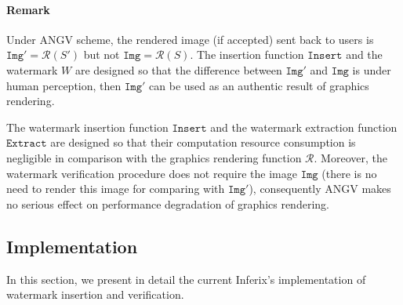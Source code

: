 \documentclass[a4paper,11pt,onecolumn]{memoir}
\begin{document}
\paragraph[Remark]{Remark}
Under ANGV scheme, the rendered image (if accepted) sent back to users is $\mathtt{Img'} = \mathcal{R}\left(S'\right)$ but not $\mathtt{Img} = \mathcal{R}\left(S\right)$. The insertion function $\mathtt{Insert}$ and the watermark $W$ are designed so that the difference between $\mathtt{Img'}$ and $\mathtt{Img}$ is under human perception, then $\mathtt{Img'}$ can be used as an authentic result of graphics rendering.

The watermark insertion function $\mathtt{Insert}$ and the watermark extraction function $\mathtt{Extract}$ are designed so that their computation resource consumption is negligible in comparison with the graphics rendering function $\mathcal{R}$. Moreover, the watermark verification procedure does not require the image $\mathtt{Img}$ (there is no need to render this image for comparing with $\mathtt{Img}'$), consequently ANGV makes no serious effect on performance degradation of graphics rendering.

\subsection[Implementation]{Implementation}
In this section, we present in detail the current Inferix's implementation of watermark insertion and verification.

\end{document}
